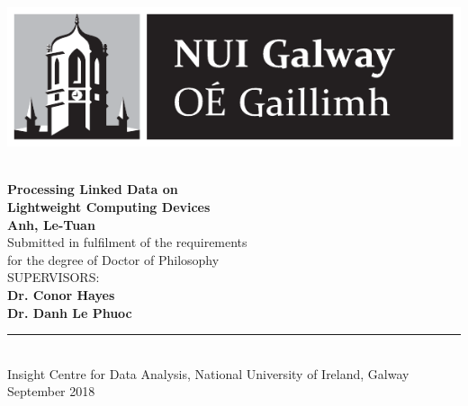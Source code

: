\documentclass[twoside, openright, titlepage]{Thesis} %
\title{\ttitle} %
\begin{document}

\frontmatter %

\fancyhead{} %
\rhead{\thepage} %
\lhead{} %

\pagestyle{fancy} %

\newcommand{\HRule}{\rule{\linewidth}{0.5mm}} %



\begin{titlepage}
\begin{center}

\includegraphics{nuig-new.pdf} %

\textsc{}\\[1cm] 

{\huge \bfseries Processing Linked Data on\\Lightweight Computing Devices}\\[3cm] %

{\LARGE \textbf{Anh, Le-Tuan}}\\[2cm]

\large {Submitted in fulfilment of the requirements\\ for the degree of Doctor of Philosophy}\\[2cm] 

{\LARGE \textsc{SUPERVISORS:}\\ \textbf{Dr. Conor Hayes}\\ \textbf{Dr. Danh Le Phuoc}\\[3.5cm] }

\HRule \\[0.0cm]

\large {Insight Centre for Data Analysis, National University of Ireland, Galway}\\
{\large September 2018}  %

\vfill
\end{center}
\end{titlepage}
\end{document}
